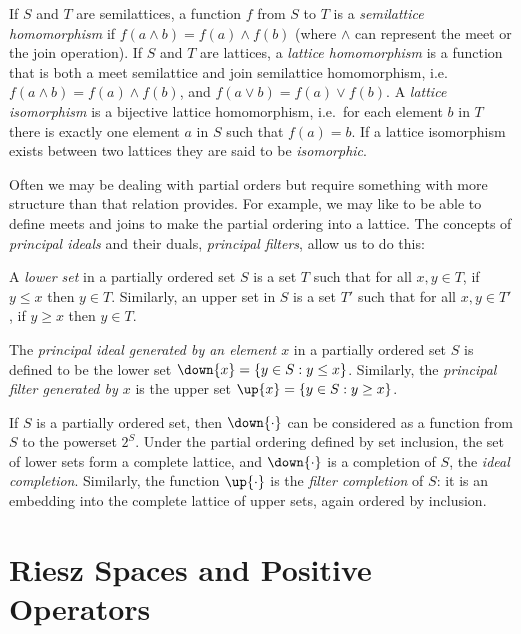 \begin{defn}
If $S$ and $T$ are semilattices, a function $f$ from $S$ to $T$ is a \emph{semilattice homomorphism} if $f(a \land b) = f(a) \land f(b)$ (where $\land$ can represent the meet or the join operation). If $S$ and $T$ are lattices, a \emph{lattice homomorphism} is a function that is both a meet semilattice and join semilattice homomorphism, i.e.~$f(a \land b) = f(a) \land f(b)$, and $f(a \lor b) = f(a) \lor f(b)$. A \emph{lattice isomorphism} is a bijective lattice homomorphism, i.e.~for each element $b$ in $T$ there is exactly one element $a$ in $S$ such that $f(a) = b$. If a lattice isomorphism exists between two lattices they are said to be \emph{isomorphic}.
\end{defn}

Often we may be dealing with partial orders but require something with more structure than that relation provides. For example, we may like to be able to define meets and joins to make the partial ordering into a lattice. The concepts of \emph{principal ideals} and their duals, \emph{principal filters}, allow us to do this:

\begin{defn}
A \emph{lower set} in a partially ordered set $S$ is a set $T$ such that for all $x,y \in T$, if $y \le x$ then $y \in T$. Similarly, an upper set in $S$ is a set $T'$ such that for all $x,y \in T'$, if $y \ge x$ then $y \in T$.

The \emph{principal ideal generated by an element $x$} in a partially ordered set $S$ is defined to be the lower set $\down{x} = \{y \in S : y \le x\}$. Similarly, the \emph{principal filter generated by $x$} is the upper set $\up{x} = \{y \in S : y \ge x\}$.
\end{defn}

\begin{prop}
If $S$ is a partially ordered set, then $\down{\cdot}$ can be considered as a function from $S$ to the powerset $2^S$. Under the partial ordering defined by set inclusion, the set of lower sets form a complete lattice, and $\down{\cdot}$ is a completion of $S$, the \emph{ideal completion}. Similarly, the function $\up{\cdot}$ is the \emph{filter completion} of $S$: it is an embedding into the complete lattice of upper sets, again ordered by inclusion.
\end{prop}


\section{Riesz Spaces and Positive Operators}
 \label{vector-lattices}
 
